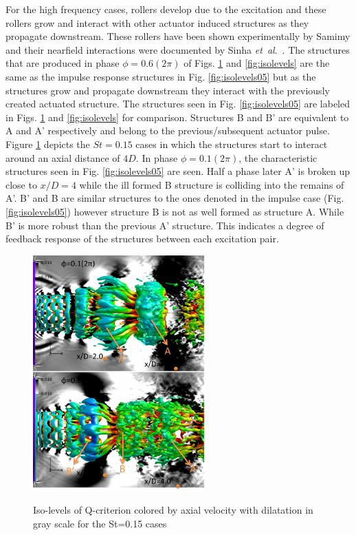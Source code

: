 \documentclass[english]{aiaa-tc}
\newcommand*{\etal}{\textit{et~al}.\ }
\begin{document}
For the high frequency cases, rollers develop due to the excitation and these rollers grow and interact with other actuator induced structures as they propagate downstream. These rollers have been shown experimentally by Samimy \cite{sm2007} and their nearfield interactions were documented by Sinha \etal \cite{sinha2013}. 
The structures that are produced in phase $\phi=0.6(2\pi)$ of Figs. \ref{fig:isolevels15} and \ref{fig:isolevels} are the same as the impulse response structures in Fig. \ref{fig:isolevels05} but as the structures grow and propagate downstream they interact with the previously created actuated structure. The structures seen in Fig. \ref{fig:isolevels05} are labeled in Figs. \ref{fig:isolevels15} and \ref{fig:isolevels} for comparison. Structures B and B' are equivalent to A and A' respectively and belong to the previous/subsequent actuator pulse.
Figure \ref{fig:isolevels15} depicts the $St=0.15$ cases in which the structures start to interact around an axial distance of $4D$. In phase $\phi=0.1(2\pi)$, the characteristic structures seen in Fig. \ref{fig:isolevels05} are seen. Half a phase later A' is broken up close to $x/D=4$ while the ill formed B structure is colliding into the remains of A'. B' and B are similar structures to the ones denoted in the impulse case (Fig. \ref{fig:isolevels05}) however structure B is not as well formed as structure A. While B' is more robust than the previous A' structure. This indicates a degree of feedback response of the structures between each excitation pair. %
\begin{figure}
\begin{center}
\begin{centering}
{\includegraphics[width=2.6in]{M09St015qcritphase0106AB}}
\end{centering}
\caption{Iso-levels of Q-criterion colored by axial velocity with dilatation in gray scale for the St=0.15 cases}
\label{fig:isolevels15}
\end{center}
\end{figure}
\end{document}
